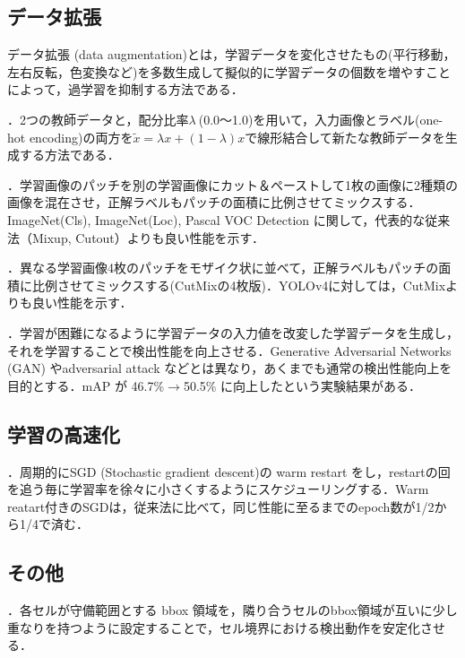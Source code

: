 \documentclass[originalpaper,fleqn]{jsaiart}     %
\begin{document}
\subsection{データ拡張}
データ拡張 (data augmentation)\cite{KSH12}とは，学習データを変化させたもの(平行移動，左右反転，色変換など)を多数生成して擬似的に学習データの個数を増やすことによって，過学習を抑制する方法である．

 \cite{ZCDL18}．2つの教師データと，配分比率$\lambda\ $(0.0〜1.0)を用いて，入力画像とラベル(one-hot encoding)の両方を$\tilde{x}=\lambda x+(1-\lambda)x$で線形結合して新たな教師データを生成する方法である．

 \cite{YHCOYC19}．学習画像のパッチを別の学習画像にカット＆ペーストして1枚の画像に2種類の画像を混在させ，正解ラベルもパッチの面積に比例させてミックスする．ImageNet(Cls), ImageNet(Loc), Pascal VOC Detection に関して，代表的な従来法（Mixup, Cutout）よりも良い性能を示す．

 \cite{BWL20}．異なる学習画像4枚のパッチをモザイク状に並べて，正解ラベルもパッチの面積に比例させてミックスする(CutMixの4枚版)．YOLOv4に対しては，CutMixよりも良い性能を示す．

 \cite{BWL20}．学習が困難になるように学習データの入力値を改変した学習データを生成し，それを学習することで検出性能を向上させる．Generative Adversarial Networks (GAN) やadversarial attack などとは異なり，あくまでも通常の検出性能向上を目的とする．mAP が 46.7\%{$\rightarrow$}50.5\% に向上したという実験結果がある．

\subsection{学習の高速化}
 \cite{LoshHut17}．周期的にSGD (Stochastic gradient descent)の warm restart をし，restartの回を追う毎に学習率を徐々に小さくするようにスケジューリングする．Warm reatart付きのSGDは，従来法に比べて，同じ性能に至るまでのepoch数が1/2から1/4で済む．

\subsection{その他}
 \cite{BWL20}．各セルが守備範囲とする bbox 領域を，隣り合うセルのbbox領域が互いに少し重なりを持つように設定することで，セル境界における検出動作を安定化させる．
\end{document}
